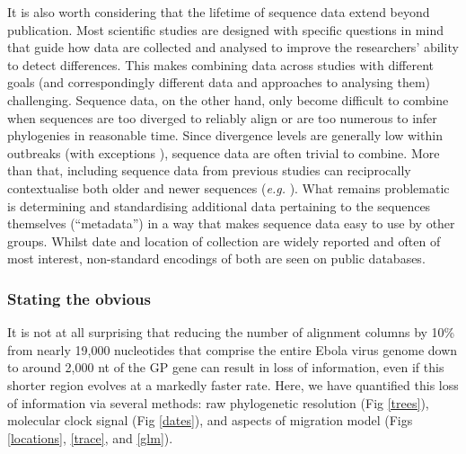 \documentclass[11pt,oneside,letterpaper]{article}
\begin{document}
It is also worth considering that the lifetime of sequence data extend beyond publication.
Most scientific studies are designed with specific questions in mind that guide how data are collected and analysed to improve the researchers' ability to detect differences.
This makes combining data across studies with different goals (and correspondingly different data and approaches to analysing them) challenging.
Sequence data, on the other hand, only become difficult to combine when sequences are too diverged to reliably align or are too numerous to infer phylogenies in reasonable time.
Since divergence levels are generally low within outbreaks (with exceptions \citep{andersen_clinical_2015}), sequence data are often trivial to combine.
More than that, including sequence data from previous studies can reciprocally contextualise both older and newer sequences (\textit{e.g.} \cite{mena_origins_2016}).
What remains problematic is determining and standardising additional data pertaining to the sequences themselves (``metadata'') in a way that makes sequence data easy to use by other groups.
Whilst date and location of collection are widely reported and often of most interest, non-standard encodings of both are seen on public databases.

\subsubsection*{Stating the obvious}
It is not at all surprising that reducing the number of alignment columns by 10\% from nearly 19,000 nucleotides that comprise the entire Ebola virus genome down to around 2,000 nt of the GP gene can result in loss of information, even if this shorter region evolves at a markedly faster rate.
Here, we have quantified this loss of information via several methods: raw phylogenetic resolution (Fig \ref{trees}), molecular clock signal (Fig \ref{dates}), and aspects of migration model (Figs \ref{locations}, \ref{trace}, and \ref{glm}).
\end{document}
